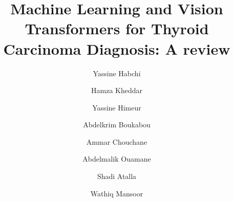 \documentclass[a4paper,fleqn]{cas-sc}
\begin{document}
\hypersetup{
    linkcolor=ElsevierBlueish,
    citecolor=ElsevierBlueish,
    urlcolor=ElsevierBlueish
}


\let\WriteBookmarks\relax
\def\floatpagepagefraction{1}
\def\textpagefraction{.001}








\title [mode = title]{Machine Learning and Vision Transformers for Thyroid Carcinoma Diagnosis: A review}




\vskip2mm
\author[1]{Yassine Habchi}
\cormark[1]

\author[2]{Hamza Kheddar}
\cormark[2]

\author[3]{Yassine Himeur}



\author[4]{Abdelkrim Boukabou}


\author[5]{Ammar Chouchane}

\author[6]{Abdelmalik Ouamane}

\author[3]{Shadi Atalla}
\author[3]{Wathiq Mansoor}


\address[1]{Institute of Technology, University Center Salhi Ahmed, Naama, Algeria}
\address[2]{LSEA Laboratory, Electrical Engineering Department, University of Medea, 26000, Algeria}
\address[3]{College of Engineering and Information Technology, University of Dubai, Dubai, UAE}
\address[4]{Department of Electronics, University of Jijel, BP 98 Ouled Aissa, 18000 Jijel, Algeria}
\address[5]{University Center of Barika. Amdoukal Road, Barika, 05001, Algeria.}
\address[6]{Laboratory of LI3C,  Mohamed Khider University, Biskra,  Algeria}
\end{document}
